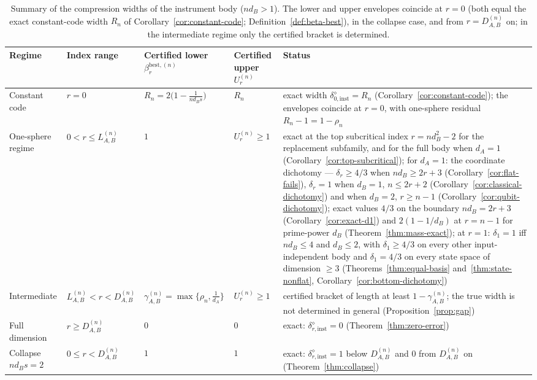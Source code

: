 \documentclass[11pt,a4paper]{article}
\begin{document}
\begin{table}[t]
\centering
\small
\setlength{\tabcolsep}{4pt}
\begin{tabular}{p{3.0cm}p{2.2cm}p{2.6cm}p{2.4cm}p{4.4cm}}
\toprule
Regime & Index range & Certified lower $\beta_r^{\mathrm{best},(n)}$ & Certified upper $U_r^{(n)}$ & Status \\
\midrule
Constant code & $r=0$ & $R_n=2\big(1-\frac{1}{nd_Bs}\big)$ & $R_n$ & exact width $\delta_{0,\mathrm{inst}}^{\diamond}=R_n$ (Corollary~\ref{cor:constant-code}); the envelopes coincide at $r=0$, with one-sphere residual $R_n-1=1-\rho_n$\\
One-sphere regime & $0<r\le L_{A,B}^{(n)}$ & $1$ & $U_r^{(n)}\ge1$ & exact at the top subcritical index $r=nd_B^2-2$ for the replacement subfamily, and for the full body when $d_A=1$ (Corollary~\ref{cor:top-subcritical}); for $d_A=1$: the coordinate dichotomy --- $\delta_r\ge4/3$ when $nd_B\ge2r+3$ (Corollary~\ref{cor:flat-fails}), $\delta_r=1$ when $d_B=1$, $n\le2r+2$ (Corollary~\ref{cor:classical-dichotomy}) and when $d_B=2$, $r\ge n-1$ (Corollary~\ref{cor:qubit-dichotomy}); exact values $4/3$ on the boundary $nd_B=2r+3$ (Corollary~\ref{cor:exact-d1}) and $2(1-1/d_B)$ at $r=n-1$ for prime-power $d_B$ (Theorem~\ref{thm:mass-exact}); at $r=1$: $\delta_1=1$ iff $nd_B\le4$ and $d_B\le2$, with $\delta_1\ge4/3$ on every other input-independent body and $\delta_1=4/3$ on every state space of dimension $\ge3$ (Theorems~\ref{thm:equal-basis} and~\ref{thm:state-nonflat}, Corollary~\ref{cor:bottom-dichotomy})\\
Intermediate & $L_{A,B}^{(n)}<r<D_{A,B}^{(n)}$ & $\gamma_{A,B}^{(n)}=\max\{\rho_n,\tfrac1{d_A}\}$ & $U_r^{(n)}\ge1$ & certified bracket of length at least $1-\gamma_{A,B}^{(n)}$; the true width is not determined in general (Proposition~\ref{prop:gap})\\
Full dimension & $r\ge D_{A,B}^{(n)}$ & $0$ & $0$ & exact: $\delta_{r,\mathrm{inst}}^{\diamond}=0$ (Theorem~\ref{thm:zero-error})\\
Collapse $nd_Bs=2$ & $0\le r<D_{A,B}^{(n)}$ & $1$ & $1$ & exact: $\delta_{r,\mathrm{inst}}^{\diamond}=1$ below $D_{A,B}^{(n)}$ and $0$ from $D_{A,B}^{(n)}$ on (Theorem~\ref{thm:collapse})\\
\bottomrule
\end{tabular}
\caption{Summary of the compression widths of the instrument body ($nd_B>1$). The lower and upper envelopes coincide at $r=0$ (both equal the exact constant-code width $R_n$ of Corollary~\ref{cor:constant-code}; Definition~\ref{def:beta-best}), in the collapse case, and from $r=D_{A,B}^{(n)}$ on; in the intermediate regime only the certified bracket is determined.}
\label{tab:summary}
\end{table}
\end{document}
